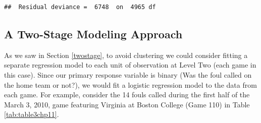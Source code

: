\documentclass[
]{krantz}
\begin{document}
\begin{verbatim}
##  Residual deviance =  6748  on  4965 df
\end{verbatim}

\hypertarget{twostage-glmm}{%
\subsection{A Two-Stage Modeling Approach}\label{twostage-glmm}}

As we saw in Section \ref{twostage}, to avoid clustering we could consider fitting a separate regression model to each unit of observation at Level Two (each game in this case). Since our primary response variable is binary (Was the foul called on the home team or not?), we would fit a logistic regression model to the data from each game. For example, consider the 14 fouls called during the first half of the March 3, 2010, game featuring Virginia at Boston College (Game 110) in Table \ref{tab:table3chp11}.

\begin{table}

\caption{\label{tab:table3chp11}Key variables from the March 3, 2010, game featuring Virginia at Boston College (Game 110).}
\centering
{}
\end{table}
\end{document}
